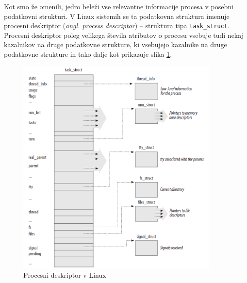 \documentclass[a4paper,12pt,openright]{book}
\begin{document}
Kot smo že omenili, jedro beleži vse relevantne informacije procesa v posebni podatkovni strukturi.
V Linux sistemih se ta podatkovna struktura imenuje procesni deskriptor (\textit{angl. process descriptor}) -- struktura tipa \texttt{task\_struct}.
Procesni deskriptor poleg velikega števila atributov o procesu vsebuje tudi nekaj kazalnikov na druge podatkovne strukture, ki vsebujejo kazalnike na druge podatkovne strukture in tako dalje kot prikazuje slika \ref{fig:linux_process_descriptor}.

\begin{figure}[h!]
	\begin{center}
		\includegraphics[width=0.9\textwidth]{images/linux_process_descriptor.png}
	\end{center}
	\caption{Procesni deskriptor v Linux \cite{Bovet_Cesati_2005}}
	\label{fig:linux_process_descriptor}
\end{figure}
\end{document}
